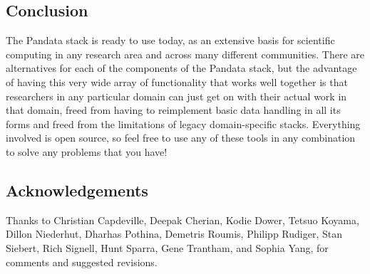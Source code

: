 \subsection{Conclusion}

The Pandata stack is ready to use today, as an extensive basis for scientific computing in any research area and across many different communities. There are alternatives for each of the components of the Pandata stack, but the advantage of having this very wide array of functionality that works well together is that researchers in any particular domain can just get on with their actual work in that domain, freed from having to reimplement basic data handling in all its forms and freed from the limitations of legacy domain-specific stacks. Everything involved is open source, so feel free to use any of these tools in any combination to solve any problems that you have!

\subsection{Acknowledgements}

Thanks to Christian Capdeville, Deepak Cherian, Kodie Dower, Tetsuo Koyama, Dillon Niederhut, Dharhas Pothina, Demetris Roumis, Philipp Rudiger, Stan Siebert, Rich Signell, Hunt Sparra, Gene Trantham, and Sophia Yang, for comments and suggested revisions.
